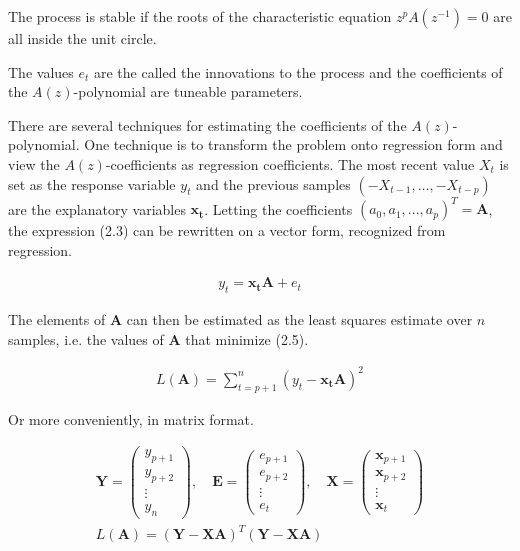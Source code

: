 The process is stable if the roots of the characteristic equation $z^p A(z^{-1}) = 0$ are all inside the unit circle. 

The values $e_t$ are the called the innovations to the process and the coefficients of the $A(z)$-polynomial are tuneable parameters. 

There are several techniques for estimating the coefficients of the $A(z)$-polynomial. One technique is to transform the problem onto regression form and view the $A(z)$-coefficients as regression coefficients. The most recent value $X_t$ is set as the response variable $y_t$ and the previous samples $(-X_{t-1},\dots,-X_{t-p})$ are the explanatory variables $\mathbf{x_t}$. Letting the coefficients $(a_0, a_1,...,a_p)^T = \mathbf{A} $, the expression (2.3) can be rewritten on a vector form, recognized from regression. 

\begin{align}
    y_t = \mathbf{x_t} \mathbf{A} + e_t
\end{align}

The elements of $\mathbf{A}$ can then be estimated as the least squares estimate over $n$ samples, i.e. the values of $\mathbf{A}$ that minimize (2.5). 

\begin{align}
    L(\mathbf{A}) = \sum_{t=p+1}^n (y_t - \mathbf{x_t} \mathbf{A})^2
\end{align}

Or more conveniently, in matrix format. 

\begin{align}
    \mathbf{Y} = \begin{pmatrix}
    y_{p+1} \\
    y_{p+2} \\
    \vdots \\
    y_n
    \end{pmatrix} , \hspace{1em} \mathbf{E} = \begin{pmatrix}
    e_{p+1} \\
    e_{p+2} \\
    \vdots \\
    e_t
    \end{pmatrix} , \hspace{1em} \mathbf{X} = \begin{pmatrix}
    \mathbf{x}_{p+1} \\
    \mathbf{x}_{p+2} \\
    \vdots \\
    \mathbf{x}_{t}
    \end{pmatrix} \\[10pt] 
    L(\mathbf{A}) = (\mathbf{Y} - \mathbf{X}\mathbf{A})^T(\mathbf{Y} - \mathbf{X}\mathbf{A})
\end{align}

